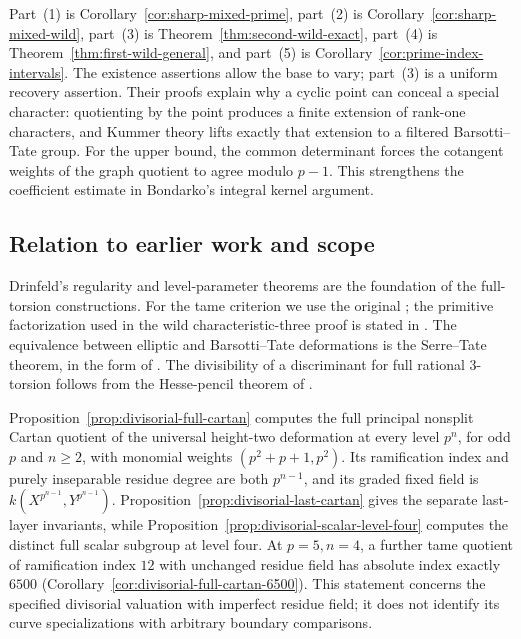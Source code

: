Part~(1) is Corollary~\ref{cor:sharp-mixed-prime}, part~(2) is Corollary~\ref{cor:sharp-mixed-wild}, part~(3) is Theorem~\ref{thm:second-wild-exact}, part~(4) is Theorem~\ref{thm:first-wild-general}, and part~(5) is Corollary~\ref{cor:prime-index-intervals}. The existence assertions allow the base to vary; part~(3) is a uniform recovery assertion. Their proofs explain why a cyclic point can conceal a special character: quotienting by the point produces a finite extension of rank-one characters, and Kummer theory lifts exactly that extension to a filtered Barsotti--Tate group. For the upper bound, the common determinant forces the cotangent weights of the graph quotient to agree modulo $p-1$. This strengthens the coefficient estimate in Bondarko's integral kernel argument.



\subsection{Relation to earlier work and scope}
Drinfeld's regularity and level-parameter theorems are the foundation of the full-torsion constructions. For the tame criterion we use the original \citet[Propositions~4.2--4.3, pp.~570--573]{Drinfeld1974}; the primitive factorization used in the wild characteristic-three proof is stated in \citet[Theorem~2.1.2, p.~437; Proposition~2.2.3, pp.~439--441]{CarterStrauch2021}. The equivalence between elliptic and Barsotti--Tate deformations is the Serre--Tate theorem, in the form of \citet[Theorem~1.2.1]{Katz1981}. The divisibility of a discriminant for full rational $3$-torsion follows from the Hesse-pencil theorem of \citet[Theorem~1.1, p.~2; Proposition~5.1, pp.~4--5]{AnemaTopTuijp2018}.

Proposition~\ref{prop:divisorial-full-cartan} computes the full principal nonsplit Cartan quotient of the universal height-two deformation at every level $p^n$, for odd $p$ and $n\ge2$, with monomial weights $(p^2+p+1,p^2)$. Its ramification index and purely inseparable residue degree are both $p^{n-1}$, and its graded fixed field is $k(X^{p^{n-1}},Y^{p^{n-1}})$. Proposition~\ref{prop:divisorial-last-cartan} gives the separate last-layer invariants, while Proposition~\ref{prop:divisorial-scalar-level-four} computes the distinct full scalar subgroup at level four. At $p=5,n=4$, a further tame quotient of ramification index $12$ with unchanged residue field has absolute index exactly $6500$ (Corollary~\ref{cor:divisorial-full-cartan-6500}). This statement concerns the specified divisorial valuation with imperfect residue field; it does not identify its curve specializations with arbitrary boundary comparisons.

